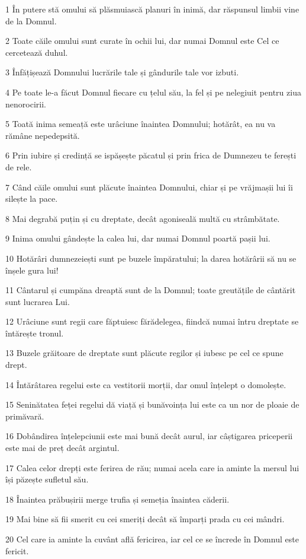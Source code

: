 \par 1 În putere stă omului să plăsmuiască planuri în inimă, dar răspunsul limbii vine de la Domnul.
\par 2 Toate căile omului sunt curate în ochii lui, dar numai Domnul este Cel ce cercetează duhul.
\par 3 Înfățișează Domnului lucrările tale și gândurile tale vor izbuti.
\par 4 Pe toate le-a făcut Domnul fiecare cu țelul său, la fel și pe nelegiuit pentru ziua nenorocirii.
\par 5 Toată inima semeață este urâciune înaintea Domnului; hotărât, ea nu va rămâne nepedepsită.
\par 6 Prin iubire și credință se ispășește păcatul și prin frica de Dumnezeu te ferești de rele.
\par 7 Când căile omului sunt plăcute înaintea Domnului, chiar și pe vrăjmașii lui îi silește la pace.
\par 8 Mai degrabă puțin și cu dreptate, decât agoniseală multă cu strâmbătate.
\par 9 Inima omului gândește la calea lui, dar numai Domnul poartă pașii lui.
\par 10 Hotărâri dumnezeiești sunt pe buzele împăratului; la darea hotărârii să nu se înșele gura lui!
\par 11 Cântarul și cumpăna dreaptă sunt de la Domnul; toate greutățile de cântărit sunt lucrarea Lui.
\par 12 Urâciune sunt regii care făptuiesc fărădelegea, fiindcă numai întru dreptate se întărește tronul.
\par 13 Buzele grăitoare de dreptate sunt plăcute regilor și iubesc pe cel ce spune drept.
\par 14 Întărâtarea regelui este ca vestitorii morții, dar omul înțelept o domolește.
\par 15 Seninătatea feței regelui dă viață și bunăvoința lui este ca un nor de ploaie de primăvară.
\par 16 Dobândirea înțelepciunii este mai bună decât aurul, iar câștigarea priceperii este mai de preț decât argintul.
\par 17 Calea celor drepți este ferirea de rău; numai acela care ia aminte la mersul lui își păzește sufletul său.
\par 18 Înaintea prăbușirii merge trufia și semeția înaintea căderii.
\par 19 Mai bine să fii smerit cu cei smeriți decât să împarți prada cu cei mândri.
\par 20 Cel care ia aminte la cuvânt află fericirea, iar cel ce se încrede în Domnul este fericit.
